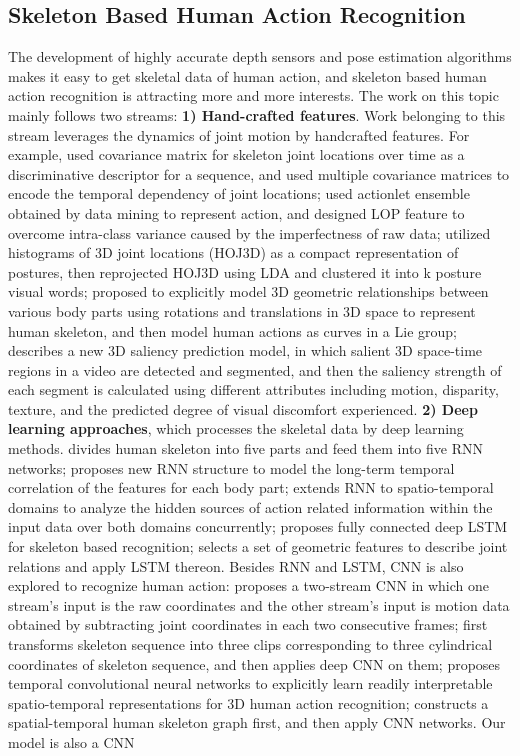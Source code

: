 \documentclass[a4paper,11pt]{article}
\begin{document}
\subsection{Skeleton Based Human Action Recognition}
The development of highly accurate depth sensors and pose estimation algorithms \cite{shotton2011real,cao2017realtime} makes it easy to get skeletal data of human action, and skeleton based human action recognition is attracting more and more interests. The work on this topic mainly follows two streams: {\bf 1) Hand-crafted features}. Work belonging to this stream leverages the dynamics of joint motion by handcrafted features. For example, \cite{hussein2013human} used covariance matrix for skeleton joint locations over time as a discriminative descriptor for a sequence, and used multiple covariance matrices to encode the temporal dependency of joint locations; \cite{wang2012mining} used actionlet ensemble obtained by data mining to represent action, and designed LOP feature to overcome intra-class variance caused by the imperfectness of raw data; \cite{xia2012view} utilized histograms of 3D joint locations (HOJ3D) as a compact representation of postures, then reprojected HOJ3D using LDA and clustered it into k posture visual words; \cite{vemulapalli2014human} proposed to explicitly model 3D geometric relationships between various body parts using rotations and translations in 3D space to represent human skeleton, and then model human actions as curves in a Lie group; \cite{kim2014saliency} describes a new 3D saliency prediction model, in which salient 3D space-time regions in a video are detected and segmented, and then the saliency strength of each segment is calculated using different attributes including motion, disparity, texture, and the predicted degree of visual discomfort experienced. {\bf 2) Deep learning approaches}, which processes the skeletal data by deep learning methods. \cite{du2015hierarchical} divides human skeleton into five parts and feed them into five RNN networks; \cite{shahroudy2016ntu} proposes new RNN structure to model the long-term temporal correlation of the features for each body part; \cite{liu2016spatio} extends RNN to spatio-temporal domains to analyze the hidden sources of action related information within the input data over both domains concurrently; \cite{zhu2016co} proposes fully connected deep LSTM for skeleton based recognition; \cite{zhang2017geometric} selects a set of geometric features to describe joint relations and apply LSTM thereon. Besides RNN and LSTM, CNN is also explored to recognize human action: \cite{li2017skeleton} proposes a two-stream CNN in which one stream's input is the raw coordinates and the other stream's input is motion data obtained by subtracting joint coordinates in each two consecutive frames; \cite{ke2017new} first transforms skeleton sequence into three clips corresponding to three cylindrical coordinates of skeleton sequence, and then applies deep CNN on them; \cite{soo2017interpretable} proposes temporal convolutional neural networks to explicitly learn readily interpretable spatio-temporal representations for 3D human action recognition; \cite{yan2018spatial} constructs a spatial-temporal human skeleton graph first, and then apply CNN networks. Our model is also a CNN 
\end{document}
